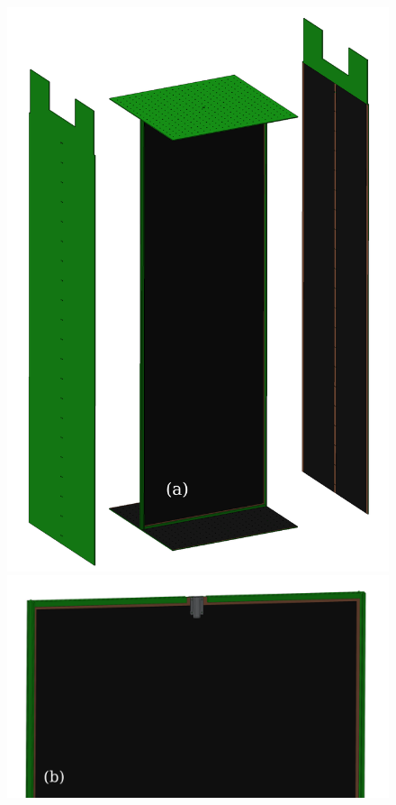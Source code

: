 \documentclass[a4paper,12pt]{article}
\begin{document}
\begin{figure}[htbp]
\centering
\begin{minipage}[b]{.4\textwidth}
\includegraphics[width=\linewidth]{field_shell_design.PNG}
\end{minipage}
\qquad
\begin{minipage}[b]{.4\textwidth}
\includegraphics[width=\linewidth]{field_shell_cathode_top.PNG}

\end{minipage}
\end{figure}
\end{document}
